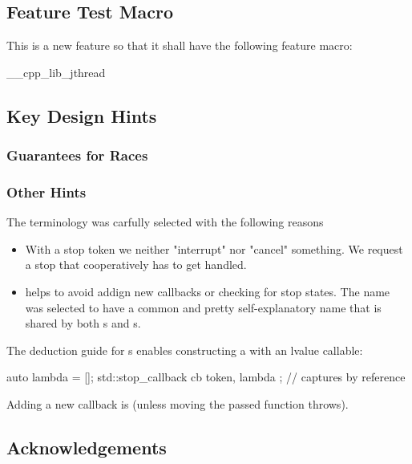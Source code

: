 \subsection*{Feature Test Macro}

This is a new feature so that it shall have the following feature macro:
\begin{codeblock}
	__cpp_lib_jthread
\end{codeblock}


\subsection*{Key Design Hints}

\subsubsection*{Guarantees for Races}

\subsubsection*{Other Hints}

The terminology was carfully selected with the following reasons
\begin{itemize}
 \item With a stop token we neither "interrupt" nor "cancel" something.
        We request a stop that cooperatively has to get handled.
 \item {} helps to avoid addign new callbacks
        or checking for stop states.
        The name was selected to have a common and pretty self-explanatory name
        that is shared by both s and s.
\end{itemize}

The deduction guide for s enables
constructing a  with an lvalue callable:
\begin{codeblock}
auto lambda = []{};
std::stop_callback cb{ token, lambda };  // captures by reference
\end{codeblock}

Adding a new callback is  (unless moving the passed function throws).


\subsection*{Acknowledgements}

